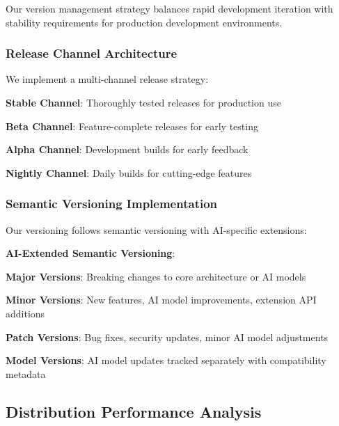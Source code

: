 Our version management strategy balances rapid development iteration with stability requirements for production development environments.

\subsubsection*{Release Channel Architecture}

We implement a multi-channel release strategy:

\begin{compactlist}
    \item \textbf{Stable Channel}: Thoroughly tested releases for production use
    \item \textbf{Beta Channel}: Feature-complete releases for early testing
    \item \textbf{Alpha Channel}: Development builds for early feedback
    \item \textbf{Nightly Channel}: Daily builds for cutting-edge features
\end{compactlist}

\subsubsection*{Semantic Versioning Implementation}

Our versioning follows semantic versioning with AI-specific extensions:

\begin{alertbox}
\textbf{AI-Extended Semantic Versioning}:
\begin{compactlist}
    \item \textbf{Major Versions}: Breaking changes to core architecture or AI models
    \item \textbf{Minor Versions}: New features, AI model improvements, extension API additions
    \item \textbf{Patch Versions}: Bug fixes, security updates, minor AI model adjustments
    \item \textbf{Model Versions}: AI model updates tracked separately with compatibility metadata
\end{compactlist}
\end{alertbox}

\subsection*{Distribution Performance Analysis}

